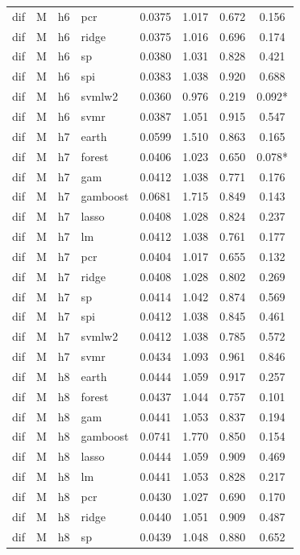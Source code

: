 \begin{ThreePartTable}
\begin{longtable}[t]{llclcccc}
dif & M & h6 & pcr & 0.0375 & 1.017 & 0.672 & 0.156\\
dif & M & h6 & ridge & 0.0375 & 1.016 & 0.696 & 0.174\\
dif & M & h6 & sp & 0.0380 & 1.031 & 0.828 & 0.421\\
dif & M & h6 & spi & 0.0383 & 1.038 & 0.920 & 0.688\\
dif & M & h6 & svmlw2 & 0.0360 & 0.976 & 0.219 & 0.092*\\
dif & M & h6 & svmr & 0.0387 & 1.051 & 0.915 & 0.547\\
\addlinespace
dif & M & h7 & earth & 0.0599 & 1.510 & 0.863 & 0.165\\
dif & M & h7 & forest & 0.0406 & 1.023 & 0.650 & 0.078*\\
dif & M & h7 & gam & 0.0412 & 1.038 & 0.771 & 0.176\\
dif & M & h7 & gamboost & 0.0681 & 1.715 & 0.849 & 0.143\\
dif & M & h7 & lasso & 0.0408 & 1.028 & 0.824 & 0.237\\
dif & M & h7 & lm & 0.0412 & 1.038 & 0.761 & 0.177\\
dif & M & h7 & pcr & 0.0404 & 1.017 & 0.655 & 0.132\\
dif & M & h7 & ridge & 0.0408 & 1.028 & 0.802 & 0.269\\
dif & M & h7 & sp & 0.0414 & 1.042 & 0.874 & 0.569\\
dif & M & h7 & spi & 0.0412 & 1.038 & 0.845 & 0.461\\
dif & M & h7 & svmlw2 & 0.0412 & 1.038 & 0.785 & 0.572\\
dif & M & h7 & svmr & 0.0434 & 1.093 & 0.961 & 0.846\\
\addlinespace
dif & M & h8 & earth & 0.0444 & 1.059 & 0.917 & 0.257\\
dif & M & h8 & forest & 0.0437 & 1.044 & 0.757 & 0.101\\
dif & M & h8 & gam & 0.0441 & 1.053 & 0.837 & 0.194\\
dif & M & h8 & gamboost & 0.0741 & 1.770 & 0.850 & 0.154\\
dif & M & h8 & lasso & 0.0444 & 1.059 & 0.909 & 0.469\\
dif & M & h8 & lm & 0.0441 & 1.053 & 0.828 & 0.217\\
dif & M & h8 & pcr & 0.0430 & 1.027 & 0.690 & 0.170\\
dif & M & h8 & ridge & 0.0440 & 1.051 & 0.909 & 0.487\\
dif & M & h8 & sp & 0.0439 & 1.048 & 0.880 & 0.652\\

\end{longtable}
\end{ThreePartTable}
